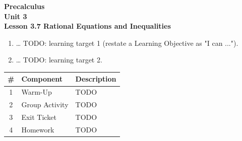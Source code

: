 \documentclass[10pt]{article}
\begin{document}
\vspace{-0.8in}

\begin{center}
  {\color{white}\textbf{\LARGE Precalculus}}\\[4pt]
  {\color{skymid}\large\textbf{Unit 3}}\\[6pt]
  {\color{white}\textbf{\large Lesson 3.7 \quad Rational Equations and Inequalities}}
\end{center}

\vspace{0.22in}
\namedateperiod
\vspace{0.18in}

\begin{learningtargetbox}
\small
\begin{enumerate}[leftmargin=1.5em, itemsep=5pt]
  \item \ldots{} TODO: learning target 1 (restate a Learning Objective as "I can ...").
  \item \ldots{} TODO: learning target 2.
\end{enumerate}
\end{learningtargetbox}

\vspace{0.14in}

\begin{tocbox}
\small
\renewcommand{\arraystretch}{1.5}
\begin{tabularx}{\linewidth}{@{} c l X @{}}
\rowcolor{sky}
\textbf{\#} & \textbf{Component} & \textbf{Description} \\
\midrule
1 & Warm-Up      & TODO \\
2 & Group Activity & TODO \\
3 & Exit Ticket  & TODO \\
4 & Homework     & TODO \\
\end{tabularx}
\end{tocbox}
\end{document}
